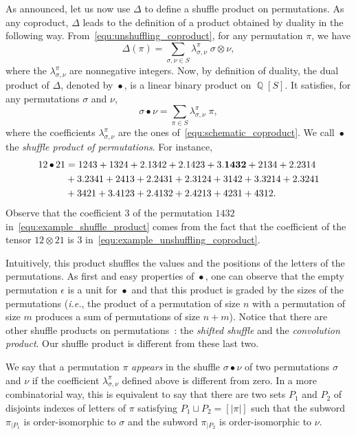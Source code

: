 \documentclass[a4paper]{llncs}
\DeclareMathOperator{\QQ}{\mathbb{Q}}
\DeclareMathOperator{\SHUFFLE}{\bullet}
\begin{document}
As announced, let us now use $\Delta$ to define a shuffle product on
permutations. As any coproduct, $\Delta$ leads to the definition of a
product obtained by duality in the following way.
From~\eqref{equ:unshuffling_coproduct}, for any permutation $\pi$, we
have
\begin{equation} \label{equ:schematic_coproduct}
    \Delta(\pi) =
    \sum_{\sigma, \nu \in S} \lambda_{\sigma, \nu}^\pi \;
    \sigma \otimes \nu,
\end{equation}
where the $\lambda_{\sigma, \nu}^\pi$ are nonnegative integers. Now,
by definition of duality, the dual product of $\Delta$, denoted by
$\SHUFFLE$, is a linear binary product on $\QQ[S]$. It satisfies, for
any permutations $\sigma$ and $\nu$,
\begin{equation}
    \sigma \SHUFFLE \nu =
    \sum_{\pi \in S}
    \lambda_{\sigma, \nu}^\pi \; \pi,
\end{equation}
where the coefficients $\lambda_{\sigma, \nu}^\pi$ are the ones
of~\eqref{equ:schematic_coproduct}. We call $\SHUFFLE$ the
{\em shuffle product of permutations}. For instance,
\begin{equation}\begin{split} \label{equ:example_shuffle_product}
    12 \SHUFFLE 21 & =
    1243 + 1324 + 2.1342 + 2.1423 + 3. {\bf 1432} + 2134 + 2.2314 \\
    & + 3.2341 + 2413 + 2.2431 + 2.3124 + 3142 + 3.3214 + 2.3241 \\
    & + 3421 + 3.4123 + 2.4132 + 2.4213 + 4231 + 4312.
\end{split}\end{equation}
Observe that the coefficient $3$ of the permutation $1432$
in~\eqref{equ:example_shuffle_product} comes from the fact that the
coefficient of the tensor $12 \otimes 21$ is $3$
in~\eqref{equ:example_unshuffling_coproduct}.

Intuitively, this product shuffles the values and the positions of the
letters of the permutations. As first and easy properties of $\SHUFFLE$,
one can observe that the empty permutation $\epsilon$ is a unit for
$\SHUFFLE$ and that this product is graded by the sizes of the
permutations ({\em i.e.}, the product of a permutation of size $n$ with
a permutation of size $m$ produces a sum of permutations of size $n + m$).
Notice that there are other shuffle products on
permutations~\cite{DHT:IJAC:2002}: the {\em shifted shuffle} and the
{\em convolution product}. Our shuffle product is different from these
last two.

We say that a permutation $\pi$ {\em appears} in the shuffle
$\sigma \SHUFFLE \nu$ of two permutations $\sigma$ and $\nu$ if the
coefficient $\lambda_{\sigma, \nu}^\pi$ defined above is different from
zero. In a more combinatorial way, this is equivalent to say that there
are two sets $P_1$ and $P_2$ of disjoints indexes of letters of $\pi$
satisfying $P_1 \sqcup P_2 = [|\pi|]$ such that the subword $\pi_{|P_1}$
is order-isomorphic to $\sigma$ and the subword $\pi_{|P_2}$ is
order-isomorphic to $\nu$.
\end{document}
